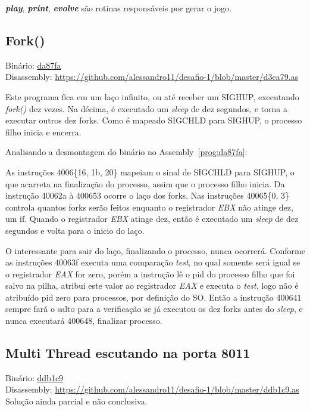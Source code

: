 \par\textbf{\emph{play}}, \textbf{\emph{print}},
\textbf{\emph{evolve}} são rotinas responsáveis por gerar o jogo.


\subsection{Fork()}
\noindent Binário: \href{https://s3.amazonaws.com/chaordic-desafio-cloud/da87fa}{da87fa}\\
Disassembly:
\href{https://github.com/alessandro11/desafio-1/blob/master/d3ea79.as}{https://github.com/alessandro11/desafio-1/blob/master/d3ea79.as}

Este programa fica em um laço infinito, ou até receber um SIGHUP,
executando \emph{fork()} dez vezes. Na décima, é executado um
\emph{sleep} de dez segundos, e torna a executar outros dez
forks. Como é mapeado SIGCHLD para SIGHUP, o processo filho inicia e
encerra.

Analisando a desmontagem do binário no Assembly~\ref{prog:da87fa}:



As instruções 4006\{16, 1b, 20\} mapeiam o sinal de SIGCHLD para
SIGHUP, o que acarreta na finalização do processo, assim que o processo
filho inicia. Da instrução 40062a à 400653 ocorre o laço dos
forks. Nas instruções 40065\{0, 3\} controla quantos forks serão
feitos enquanto o registrador \emph{EBX} não atinge dez, um if. Quando o
registrador \emph{EBX} atinge dez, então é executado um \emph{sleep} de dez
segundos e volta para o inicio do laço.

O interessante para sair do laço, finalizando o processo, nunca
ocorrerá. Conforme as instruções 40063f executa uma comparação
\emph{test}, no qual somente será igual se o registrador \emph{EAX} for zero,
porém a instrução lê o pid do processo filho que foi salvo na pilha,
atribui este valor ao registrador \emph{EAX} e executa o \emph{test}, logo
não é atribuído pid zero para processos, por definição do SO. Então a
instrução 400641 sempre fará o salto para a verificação se já executou
os dez forks antes do \emph{sleep}, e nunca executará 400648,
finalizar processo.


\subsection{Multi Thread escutando na porta 8011}
\noindent Binário: \href{https://s3.amazonaws.com/chaordic-desafio-cloud/ddb1c9}{ddb1c9}\\
Disassembly:
\href{https://github.com/alessandro11/desafio-1/blob/master/ddb1c9.as}{https://github.com/alessandro11/desafio-1/blob/master/ddb1c9.as}\\

Solução ainda parcial e não conclusiva.

